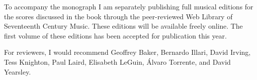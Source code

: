 \documentclass{vcbook-proposal}
\begin{document}
To accompany the monograph I am separately publishing full musical editions for
the scores discussed in the book through the peer-reviewed Web Library of
Seventeenth Century Music.%
    \Autocite{Cashner:SingingAboutSingingI}
These editions will be available freely online.
The first volume of these editions has been accepted for publication this year.

For reviewers, I would recommend Geoffrey Baker, Bernardo Illari, David Irving,
Tess Knighton, Paul Laird, Elisabeth LeGuin, Álvaro Torrente, and David
Yearsley.
\end{document}
